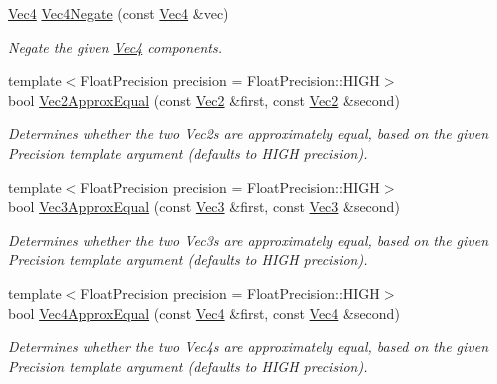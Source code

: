 \begin{DoxyCompactItemize}
\hyperlink{classgofxmath_1_1_vec4}{Vec4} \hyperlink{group___s_i_s_d_vec_math_ga9ba6951d54c6a4d9d513580f5bf3b928}{Vec4\+Negate} (const \hyperlink{classgofxmath_1_1_vec4}{Vec4} \&vec)
\begin{DoxyCompactList}\small\item\em Negate the given \hyperlink{classgofxmath_1_1_vec4}{Vec4} components. \end{DoxyCompactList}\item 
{\footnotesize template$<$Float\+Precision precision = Float\+Precision\+::\+H\+I\+G\+H$>$ }\\bool \hyperlink{group___s_i_s_d_vec_math_gae2e5df24e56917013fefa17579bb8749}{Vec2\+Approx\+Equal} (const \hyperlink{classgofxmath_1_1_vec2}{Vec2} \&first, const \hyperlink{classgofxmath_1_1_vec2}{Vec2} \&second)
\begin{DoxyCompactList}\small\item\em Determines whether the two Vec2s are approximately equal, based on the given Precision template argument (defaults to H\+I\+G\+H precision). \end{DoxyCompactList}\item 
{\footnotesize template$<$Float\+Precision precision = Float\+Precision\+::\+H\+I\+G\+H$>$ }\\bool \hyperlink{group___s_i_s_d_vec_math_gac042c4407bfaa66715e3c4b5b0a839f4}{Vec3\+Approx\+Equal} (const \hyperlink{classgofxmath_1_1_vec3}{Vec3} \&first, const \hyperlink{classgofxmath_1_1_vec3}{Vec3} \&second)
\begin{DoxyCompactList}\small\item\em Determines whether the two Vec3s are approximately equal, based on the given Precision template argument (defaults to H\+I\+G\+H precision). \end{DoxyCompactList}\item 
{\footnotesize template$<$Float\+Precision precision = Float\+Precision\+::\+H\+I\+G\+H$>$ }\\bool \hyperlink{group___s_i_s_d_vec_math_ga819b8c958e12f0838288c641af7e1ab6}{Vec4\+Approx\+Equal} (const \hyperlink{classgofxmath_1_1_vec4}{Vec4} \&first, const \hyperlink{classgofxmath_1_1_vec4}{Vec4} \&second)
\begin{DoxyCompactList}\small\item\em Determines whether the two Vec4s are approximately equal, based on the given Precision template argument (defaults to H\+I\+G\+H precision). \end{DoxyCompactList}\item 

\end{DoxyCompactItemize}
